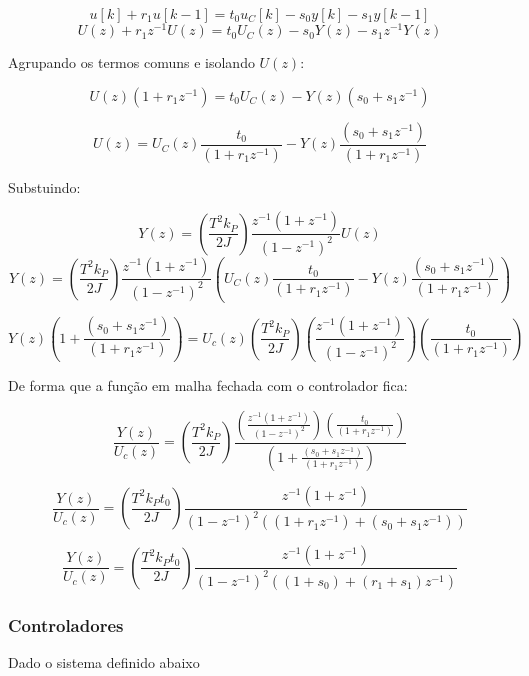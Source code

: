 \documentclass[a4paper,11pt]{article}
\begin{document}
$$u[k] + r_1 u[k -1] = t_0 u_C[k] - s_0 y[k] - s_1 y[k-1]$$
$$U(z) + r_1 z^{-1}U(z) = t_0 U_C(z) - s_0 Y(z) - s_1 z^{-1}Y(z)$$

Agrupando os termos comuns e isolando $U(z)$:

$$U(z)\left(1 + r_1 z^{-1}\right) = t_0 U_C(z) - Y(z)\left(s_0 + s_1 z^{-1}\right)$$

\begin{equation}
U(z) = U_C(z)\frac{t_0}{\left(1 + r_1 z^{-1}\right)} -
  Y(z)\frac{\left(s_0 + s_1 z^{-1}\right)}{\left(1 + r_1 z^{-1}\right)}
\end{equation}

Substuindo:

$$
    Y(z) =\left(\frac{T^2 k_{P}}{2J}\right)\frac{z^{-1}(1+z^{-1})}{(1-z^{-1})^2}U(z)
$$
$$
    Y(z) = \left(\frac{T^2 k_{P}}{2J}\right)\frac{z^{-1}(1+z^{-1})}{(1-z^{-1})^2}\left( U_C(z)\frac{t_0}{\left(1 + r_1 z^{-1}\right)} - Y(z)\frac{\left(s_0 + s_1 z^{-1}\right)}{\left(1 + r_1 z^{-1}\right)}\right)
$$

$$
    Y(z)\left(1 + \frac{\left(s_0 + s_1 z^{-1}\right)}{\left(1 + r_1 z^{-1}\right)}\right)
= U_c(z)\left(\frac{T^2 k_{P}}{2J}\right)\left(\frac{z^{-1}(1+z^{-1})}{(1-z^{-1})^2}\right)\left( \frac{t_0}{\left(1 + r_1 z^{-1}\right)}\right)
$$

De forma que a função em malha fechada com o controlador fica:

$$
    \frac{Y(z)}{U_c(z)} = \left(\frac{T^2 k_{P}}{2J}\right)\frac{\left(\frac{z^{-1}(1+z^{-1})}{(1-z^{-1})^2}\right)\left( \frac{t_0}{\left(1 + r_1 z^{-1}\right)}\right)}{\left(1 + \frac{\left(s_0 + s_1 z^{-1}\right)}{\left(1 + r_1 z^{-1}\right)}\right)}
$$

$$
    \frac{Y(z)}{U_c(z)} = \left(\frac{T^2 k_{P}t_0}{2J}\right)
    \frac{
        z^{-1}(1+z^{-1})
    }{
        (1-z^{-1})^2 \left((1 + r_1 z^{-1}) + \left(s_0 + s_1 z^{-1}\right)\right)
     }
$$

\begin{equation}
    \frac{Y(z)}{U_c(z)} = \left(\frac{T^2 k_{P}t_0}{2J}\right)
    \frac{
        z^{-1}(1+z^{-1})
    }{
        (1-z^{-1})^2 \left((1 + s_0) + (r_1 + s_1) z^{-1}\right)
     }
\end{equation}

\subsubsection{Controladores}

Dado o sistema definido abaixo
\end{document}
